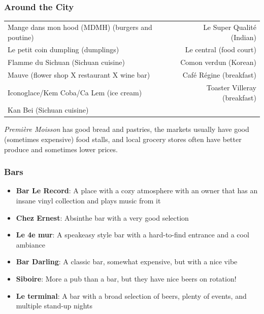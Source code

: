 \subsubsection{Around the City}
\begin{table}[H]
    \centering
    \begin{tabular}{lr}
         \hline
         Mange dans mon hood (MDMH) (burgers and poutine) &  Le Super Qualité (Indian)\\
         Le petit coin dumpling (dumplings) & Le central (food court)\\
        Flamme du Sichuan (Sichuan cuisine) & Comon verdun (Korean) \\
        Mauve (flower shop X restaurant X wine bar) & Café Régine (breakfast)\\
        Iconoglace/Kem Coba/Ca Lem (ice cream) & Toaster Villeray (breakfast)\\
        Kan Bei (Sichuan cuisine) \\
         \hline
    \end{tabular}
\end{table}

\textit{Première Moisson} has good bread and pastries, the markets usually have good (sometimes expensive) food stalls, and local grocery stores often have better produce and sometimes lower prices.

\subsubsection{Bars}
\begin{itemize}
    \item \textbf{Bar Le Record}: A place with a cozy atmosphere with an owner that has an insane vinyl collection and plays music from it
    \item \textbf{Chez Ernest}: Absinthe bar with a very good selection
    \item \textbf{Le 4e mur}: A speakeasy style bar with a hard-to-find entrance and a cool ambiance
    \item \textbf{Bar Darling}: A classic bar, somewhat expensive, but with a nice vibe
    \item \textbf{Siboire}: More a pub than a bar, but they have nice beers on rotation!
    \item \textbf{Le terminal}: A bar with a broad selection of beers, plenty of events, and multiple stand-up nights
\end{itemize}

